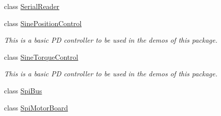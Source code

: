 \begin{DoxyCompactItemize}
class \hyperlink{classblmc__drivers_1_1SerialReader}{Serial\+Reader}
\item 
class \hyperlink{classblmc__drivers_1_1SinePositionControl}{Sine\+Position\+Control}
\begin{DoxyCompactList}\small\item\em This is a basic PD controller to be used in the demos of this package. \end{DoxyCompactList}\item 
class \hyperlink{classblmc__drivers_1_1SineTorqueControl}{Sine\+Torque\+Control}
\begin{DoxyCompactList}\small\item\em This is a basic PD controller to be used in the demos of this package. \end{DoxyCompactList}\item 
class \hyperlink{classblmc__drivers_1_1SpiBus}{Spi\+Bus}
\item 
class \hyperlink{classblmc__drivers_1_1SpiMotorBoard}{Spi\+Motor\+Board}
\end{DoxyCompactItemize}
